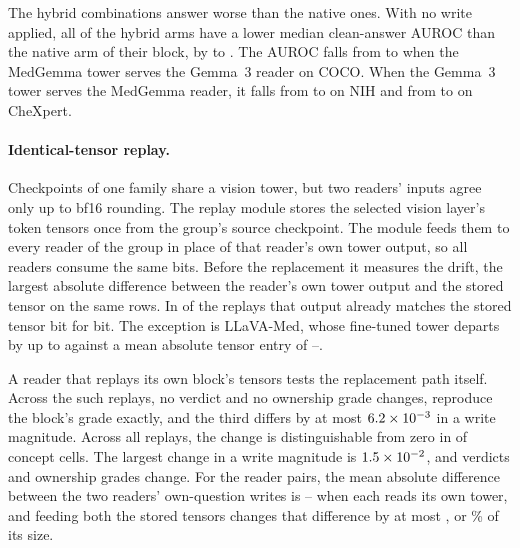 The hybrid combinations answer worse than the native ones. With no write applied, all \cfSwapAnsWorse{} of the \cfSwapAnsArms{} hybrid arms have a lower median clean-answer AUROC than the native arm of their block, by \cfSwapAnsDropMin{} to \cfSwapAnsDropMax{}. The AUROC falls from \cfSwapAnsNativeGemCoco{} to \cfSwapAnsHybridGemCoco{} when the MedGemma tower serves the Gemma~3 reader on COCO. When the Gemma~3 tower serves the MedGemma reader, it falls from \cfSwapAnsNativeMedNih{} to \cfSwapAnsHybridMedNih{} on NIH and from \cfSwapAnsNativeMedChex{} to \cfSwapAnsHybridMedChex{} on CheXpert.

\paragraph{Identical-tensor replay.} Checkpoints of one family share a vision tower, but two readers' inputs agree only up to bf16 rounding. The replay module stores the selected vision layer's token tensors once from the group's source checkpoint. The module feeds them to every reader of the group in place of that reader's own tower output, so all readers consume the same bits. Before the replacement it measures the drift, the largest absolute difference between the reader's own tower output and the stored tensor on the same rows. In \cfReplayDriftZero{} of the \cfReplayBlocks{} replays that output already matches the stored tensor bit for bit. The exception is LLaVA-Med, whose fine-tuned tower departs by up to \cfReplayDriftMax{} against a mean absolute tensor entry of \cfReplayTensorMin{}--\cfReplayTensorMax{}.

A reader that replays its own block's tensors tests the replacement path itself. Across the \cfReplaySelf{} such replays, no verdict and no ownership grade changes, \cfReplaySelfExact{} reproduce the block's grade exactly, and the third differs by at most $6.2\times10^{-3}$ in a write magnitude. Across all \cfReplayBlocks{} replays, the change is distinguishable from zero in \cfReplayMoved{} of \cfReplayCells{} concept cells. The largest change in a write magnitude is $1.5\times10^{-2}$, and \cfReplayVerdictChanges{} verdicts and \cfReplayOwnedChanges{} ownership grades change. For the \cfReplayPairs{} reader pairs, the mean absolute difference between the two readers' own-question writes is \cfReplayPairOwnMin{}--\cfReplayPairOwnMax{} when each reads its own tower, and feeding both the stored tensors changes that difference by at most \cfReplayChangeMax{}, or \cfReplayRelMax\% of its size.

